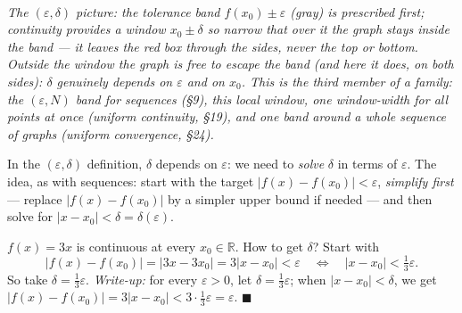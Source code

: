 \documentclass[11pt]{report}
\newcommand{\figcap}[1]{\\[1.5mm]\parbox{0.92\textwidth}{\small\itshape #1}}
\begin{document}
\begin{center}
\figcap{The $(\varepsilon, \delta)$ picture: the tolerance band $f(x_0) \pm \varepsilon$ (gray) is prescribed first; continuity provides a window $x_0 \pm \delta$ so narrow that over it the graph stays inside the band --- it leaves the red box through the sides, never the top or bottom. Outside the window the graph is free to escape the band (and here it does, on both sides): $\delta$ genuinely depends on $\varepsilon$ and on $x_0$. This is the third member of a family: the $(\varepsilon, N)$ band for sequences (\S 9), this local window, one window-width for \emph{all} points at once (uniform continuity, \S 19), and one band around a whole sequence of graphs (uniform convergence, \S 24).}
\end{center}


\begin{rembox}
In the $(\varepsilon,\delta)$ definition, $\delta$ depends on $\varepsilon$: we need to \emph{solve} $\delta$ in terms of $\varepsilon$. The idea, as with sequences: start with the target $|f(x) - f(x_0)| < \varepsilon$, \emph{simplify first} --- replace $|f(x)-f(x_0)|$ by a simpler upper bound if needed --- and then solve for $|x - x_0| < \delta = \delta(\varepsilon)$.
\end{rembox}

\begin{exbox}
$f(x) = 3x$ is continuous at every $x_0 \in \mathbb{R}$. How to get $\delta$? Start with
\[
|f(x) - f(x_0)| = |3x - 3x_0| = 3|x - x_0| < \varepsilon \quad \iff \quad |x - x_0| < \tfrac13\varepsilon.
\]
So take $\delta = \tfrac13 \varepsilon$. \emph{Write-up:} for every $\varepsilon > 0$, let $\delta = \tfrac13\varepsilon$; when $|x - x_0| < \delta$, we get $|f(x) - f(x_0)| = 3|x-x_0| < 3 \cdot \tfrac13 \varepsilon = \varepsilon$. \hfill $\blacksquare$
\end{exbox}
\end{document}

